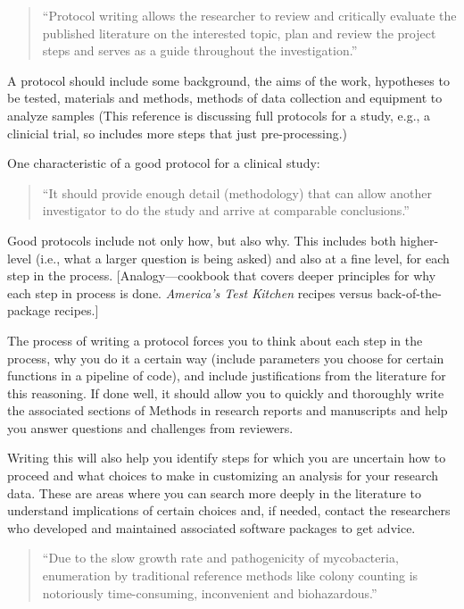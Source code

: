 \documentclass[]{tufte-book}
\begin{document}
\begin{quote}
``Protocol writing allows the researcher to review and critically evaluate the published literature on the interested topic, plan and review the project steps and serves as a guide throughout the investigation.'' \citep{al2016protocol}
\end{quote}

A protocol should include some background, the aims of the work, hypotheses
to be tested, materials and methods, methods of data collection and
equipment to analyze samples \citep{al2016protocol} (This reference is discussing
full protocols for a study, e.g., a clinicial trial, so includes more steps
that just pre-processing.)

One characteristic of a good protocol for a clinical study:

\begin{quote}
``It should provide enough detail (methodology) that can allow another investigator to do the study and arrive at comparable conclusions.'' \citep{al2016protocol}
\end{quote}

Good protocols include not only how, but also why. This includes both
higher-level (i.e., what a larger question is being asked) and also at a
fine level, for each step in the process. {[}Analogy---cookbook that covers
deeper principles for why each step in process is done. \emph{America's Test Kitchen}
recipes versus back-of-the-package recipes.{]}

The process of writing a protocol forces you to think about each step in the
process, why you do it a certain way (include parameters you choose for
certain functions in a pipeline of code), and include justifications from
the literature for this reasoning. If done well, it should allow you to
quickly and thoroughly write the associated sections of Methods in research
reports and manuscripts and help you answer questions and challenges from
reviewers.

Writing this will also help you identify steps for which you are uncertain
how to proceed and what choices to make in customizing an analysis for your
research data. These are areas where you can search more deeply in the
literature to understand implications of certain choices and, if needed,
contact the researchers who developed and maintained associated software
packages to get advice.

\begin{quote}
``Due to the slow growth rate and pathogenicity of mycobacteria, enumeration by
traditional reference methods like colony counting is notoriously
time-consuming, inconvenient and biohazardous.'' \citep{pathak2012counting}
\end{quote}
\end{document}
